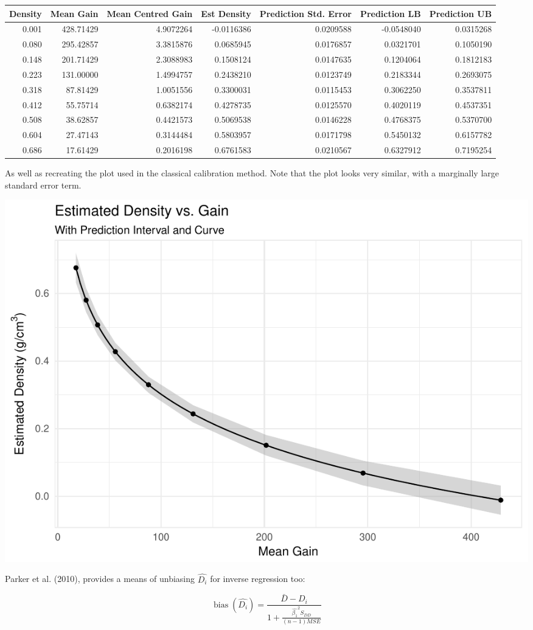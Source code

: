\documentclass[]{article}
\begin{document}
\begin{longtable}[]{@{}rrrrrrr@{}}
\toprule
Density & Mean Gain & Mean Centred Gain & Est Density & Prediction Std.
Error & Prediction LB & Prediction UB\tabularnewline
\midrule
\endhead
0.001 & 428.71429 & 4.9072264 & -0.0116386 & 0.0209588 & -0.0548040 &
0.0315268\tabularnewline
0.080 & 295.42857 & 3.3815876 & 0.0685945 & 0.0176857 & 0.0321701 &
0.1050190\tabularnewline
0.148 & 201.71429 & 2.3088983 & 0.1508124 & 0.0147635 & 0.1204064 &
0.1812183\tabularnewline
0.223 & 131.00000 & 1.4994757 & 0.2438210 & 0.0123749 & 0.2183344 &
0.2693075\tabularnewline
0.318 & 87.81429 & 1.0051556 & 0.3300031 & 0.0115453 & 0.3062250 &
0.3537811\tabularnewline
0.412 & 55.75714 & 0.6382174 & 0.4278735 & 0.0125570 & 0.4020119 &
0.4537351\tabularnewline
0.508 & 38.62857 & 0.4421573 & 0.5069538 & 0.0146228 & 0.4768375 &
0.5370700\tabularnewline
0.604 & 27.47143 & 0.3144484 & 0.5803957 & 0.0171798 & 0.5450132 &
0.6157782\tabularnewline
0.686 & 17.61429 & 0.2016198 & 0.6761583 & 0.0210567 & 0.6327912 &
0.7195254\tabularnewline
\bottomrule
\end{longtable}

As well as recreating the plot used in the classical calibration method.
Note that the plot looks very similar, with a marginally large standard
error term.

\includegraphics{Project_05_files/figure-latex/IR Dens vs Gain-1.pdf}

Parker et al. (2010), provides a means of unbiasing \(\hat{D_{i}}\) for
inverse regression too:

\[
  \operatorname{bias}\left( \hat{D_{i}} \right) =
  \frac{\bar{D} - D_{i}}{1 + \frac{\hat{\beta_{1}}^{2}S_{DD}}{(n-1)MSE}}
\]
\end{document}
